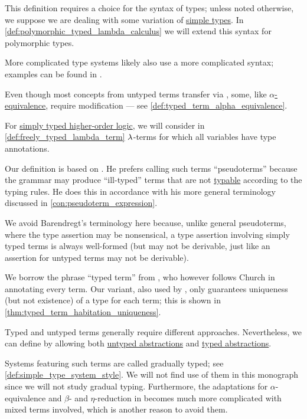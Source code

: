 \begin{comments}
  \item This definition requires a choice for the syntax of types; unless noted otherwise, we suppose we are dealing with some variation of \hyperref[def:simple_type]{simple types}. In \cref{def:polymorphic_typed_lambda_calculus} we will extend this syntax for polymorphic types.

  More complicated type systems likely also use a more complicated syntax; examples can be found in .

  \item Even though most concepts from untyped terms transfer via , some, like \hyperref[def:lambda_term_alpha_equivalence]{\( \alpha \)-equivalence}, require modification --- see \cref{def:typed_term_alpha_equivalence}.

  \item For \hyperref[def:simply_typed_hol]{simply typed higher-order logic}, we will consider in \cref{def:freely_typed_lambda_term} \( {\mathrm \lambda} \)-terms for which all variables have type annotations.

  \item Our definition is based on . He prefers calling such terms \enquote{pseudoterms} because the grammar may produce \enquote{ill-typed} terms that are not \hyperref[def:typability]{typable} according to the typing rules. He does this in accordance with his more general terminology discussed in \cref{con:pseudoterm_expression}.

  We avoid Barendregt's terminology here because, unlike general pseudoterms, where the type assertion may be nonsensical, a type assertion involving simply typed terms is always well-formed (but may not be derivable, just like an assertion for untyped terms may not be derivable).

  We borrow the phrase \enquote{typed term} from , who however follows Church in annotating every term. Our variant, also used by , only guarantees uniqueness (but not existence) of a type for each term; this is shown in \cref{thm:typed_term_habitation_uniqueness}.
\end{comments}

\begin{remark}\label{rem:mixed_lambda_term}\mimprovised
  Typed and untyped terms generally require different approaches. Nevertheless, we can define  by allowing both \hyperref[def:lambda_term]{untyped abstractions} and \hyperref[def:typed_lambda_term]{typed abstractions}.

  Systems featuring such terms are called gradually typed; see \cref{def:simple_type_system_style}. We will not find use of them in this monograph since we will not study gradual typing. Furthermore, the adaptations for \( \alpha \)-equivalence and \( \beta \)- and \( \eta \)-reduction in  becomes much more complicated with mixed terms involved, which is another reason to avoid them.
\end{remark}

